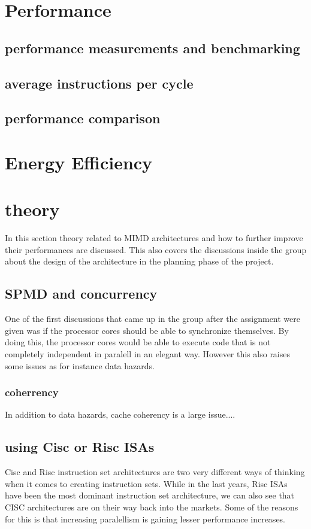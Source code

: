 \section{Performance}
\subsection{performance measurements and benchmarking}
\subsection{average instructions per cycle}
\subsection{performance comparison}


\section{Energy Efficiency}

\section{theory}
In this section theory related to MIMD architectures and how to further improve their performances are discussed.
This also covers the discussions inside the group about the design of the architecture in the planning phase of the project.
\subsection{SPMD and concurrency}
One of the first discussions that came up in the group after the assignment were given was if the processor cores should
be able to synchronize themselves. By doing this, the processor cores would be able to execute code that is not completely independent in paralell in an elegant way.
However this also raises some issues as for instance data hazards.

\subsubsection{coherrency}
In addition to data hazards, cache coherency is a large issue....

\subsection{using Cisc or Risc ISAs}
Cisc and Risc instruction set architectures are two very different ways of thinking when it comes to creating instruction sets.
While in the last years, Risc ISAs have been the most dominant instruction set architecture, we can also see that CISC architectures
are on their way back into the markets. Some of the reasons for this is that increasing paralellism is gaining lesser performance increases.

